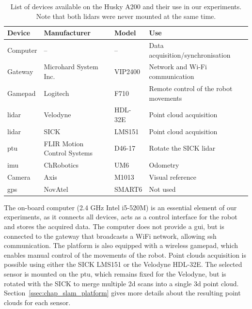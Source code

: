 \begin{table}[H]
    \centering
    \begin{tabular}{@{}llll@{}}
        \toprule
        \textbf{Device} & \textbf{Manufacturer}       & \textbf{Model}  & \textbf{Use}                          \\ \hline
        Computer        & --                          & --              & Data acquisition/synchronisation      \\
        Gateway         & Microhard System Inc.       & VIP2400         & Network and Wi-Fi communication       \\
        Gamepad         & Logitech                    & F710            & Remote control of the robot movements \\
        \gls*{lidar}    & Velodyne                    & HDL-32E         & Point cloud acquisition               \\
        \gls*{lidar}    & SICK                        & LMS151          & Point cloud acquisition               \\
        \gls*{ptu}      & FLIR Motion Control Systems & D46-17          & Rotate the SICK \gls*{lidar}          \\
        \gls*{imu}      & ChRobotics                  & UM6             & Odometry                              \\
        Camera          & Axis                        & M1013           & Visual reference                      \\
        \gls*{gps}      & NovAtel                     & SMART6          & Not used                              \\
        \bottomrule
    \end{tabular}
    \caption[List of devices available on the Husky A200 and their use in our experiments.]{List of devices available on the Husky A200 and their use in our experiments. Note that both \gls*{lidar}s were never mounted at the same time.}
    \label{tab:husky_devices}
\end{table}

The on-board computer (2.4 GHz Intel i5-520M) is an essential element of our experiments, as it connects all devices, acts as a control interface for the robot and stores the acquired data. The computer does not provide a \gls*{gui}, but is connected to the gateway that broadcasts a WiFi network, allowing \gls*{ssh} communication. The platform is also equipped with a wireless gamepad, which enables manual control of the movements of the robot. Point clouds acquisition is possible using either the SICK LMS151 or the Velodyne HDL-32E. The selected sensor is mounted on the \gls*{ptu}, which remains fixed for the Velodyne, but is rotated with the SICK to merge multiple \gls*{2d} scans into a single \gls*{3d} point cloud. Section~\ref{ssec:chap_slam_platform} gives more details about the resulting point clouds for each sensor.

